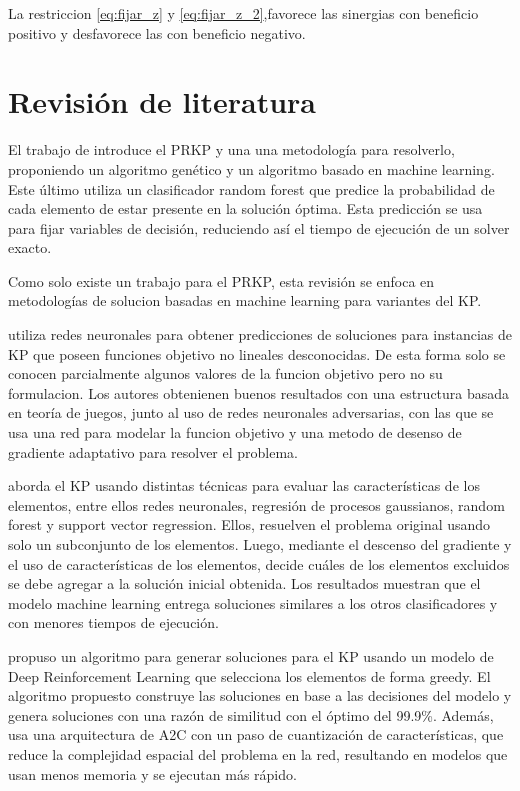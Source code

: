 \documentclass[spanish, a4paper, 12pt, openany,final]{book}
\begin{document}
    La restriccion \eqref{eq:fijar_z} y \eqref{eq:fijar_z_2},favorece las sinergias con beneficio positivo y desfavorece las con beneficio negativo.
  
\section{Revisión de literatura}


El trabajo de \cite{baldo_polynomial_2023} introduce el PRKP y una una metodología para resolverlo, proponiendo un algoritmo genético y un algoritmo basado en machine learning. Este último utiliza un clasificador random forest que predice la probabilidad de cada elemento de estar presente en la solución óptima. Esta predicción se usa para fijar variables de decisión, reduciendo así el tiempo de ejecución de un solver exacto.

Como solo existe un trabajo para el PRKP, esta revisión se enfoca en metodologías de solucion basadas en machine learning para variantes del KP.

\cite{li_novel_2021} utiliza redes neuronales para obtener predicciones de soluciones para instancias de KP que poseen funciones objetivo no lineales desconocidas. De esta forma solo se conocen parcialmente algunos valores de la funcion objetivo pero no su formulacion. Los autores obtenienen buenos resultados con una estructura basada en teoría de juegos, junto al uso de redes neuronales adversarias, con las que se usa una red para modelar la funcion objetivo y una metodo de desenso de gradiente adaptativo para resolver el problema.

\cite{rezoug_application_2022} aborda el KP usando distintas técnicas para evaluar las características de los elementos, entre ellos redes neuronales, regresión de procesos gaussianos, random forest y support vector regression. Ellos, resuelven el problema original usando solo un subconjunto de los elementos. Luego, mediante el descenso del gradiente y el uso de características de los elementos, decide cuáles de los elementos excluidos se debe agregar a la solución inicial obtenida. Los resultados muestran que el modelo machine learning entrega soluciones similares a los otros clasificadores y con menores tiempos de ejecución.

\cite{afshar_state_2020} propuso un algoritmo para generar soluciones para el KP usando un modelo de Deep Reinforcement Learning que selecciona los elementos de forma greedy. El algoritmo propuesto construye las soluciones en base a las decisiones del modelo y genera soluciones con una razón de similitud con el óptimo del 99.9\%. Además, usa una arquitectura de A2C con un paso de cuantización de características, que reduce la complejidad espacial del problema en la red, resultando en modelos que usan menos memoria y se ejecutan más rápido.
\end{document}
